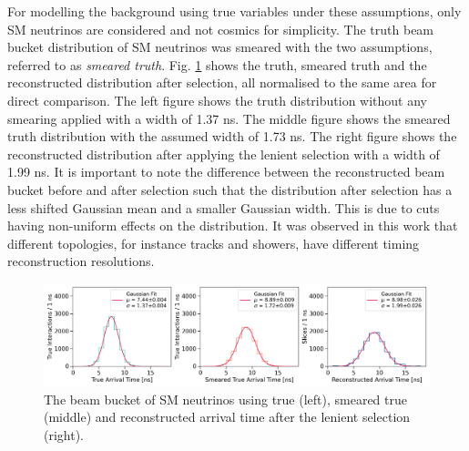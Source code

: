 For modelling the background using true variables under these assumptions, only SM neutrinos are considered and not cosmics for simplicity. 
The truth beam bucket distribution of SM neutrinos was smeared with the two assumptions, referred to as \textit{smeared truth}.
Fig. \ref{fig:gaus_truth_smear} shows the truth, smeared truth and the reconstructed distribution after selection, all normalised to the same area for direct comparison.
The left figure shows the truth distribution without any smearing applied with a width of 1.37 ns.
The middle figure shows the smeared truth distribution with the assumed width of 1.73 ns.
The right figure shows the reconstructed distribution after applying the lenient selection with a width of 1.99 ns.
It is important to note the difference between the reconstructed beam bucket before and after selection such that the distribution after selection has a less shifted Gaussian mean and a smaller Gaussian width.
This is due to cuts having non-uniform effects on the distribution.
It was observed in this work that different topologies, for instance tracks and showers, have different timing reconstruction resolutions. 

\begin{figure}[ht!]
    \centering
    \includegraphics[width=\textwidth]{truth_smear_reco_gaus.png}
    \caption[Beam Bucket Distributions of SM Neutrinos Assuming an Improved Timing Resolution]{The beam bucket of SM neutrinos using true (left), smeared true (middle) and reconstructed arrival time after the lenient selection (right).}
    \label{fig:gaus_truth_smear}
\end{figure}

